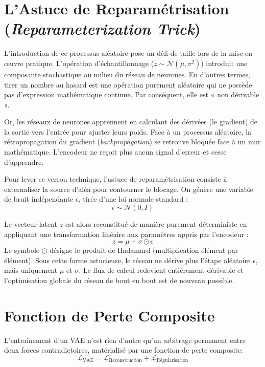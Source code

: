 \documentclass[11pt,a4paper]{report}
\begin{document}
\section{L'Astuce de Reparamétrisation (\textit{Reparameterization Trick})}

L'introduction de ce processus aléatoire pose un défi de taille lors de la mise en œuvre pratique. L'opération d'échantillonnage ($z \sim \mathcal{N}(\mu, \sigma^2)$) introduit une composante stochastique au milieu du réseau de neurones. En d'autres termes, tirer un nombre au hasard est une opération purement aléatoire qui ne possède pas d'expression mathématique continue. Par conséquent, elle est « non dérivable ». 

Or, les réseaux de neurones apprennent en calculant des dérivées (le gradient) de la sortie vers l'entrée pour ajuster leurs poids. Face à un processus aléatoire, la rétropropagation du gradient (\textit{backpropagation}) se retrouve bloquée face à un mur mathématique. L'encodeur ne reçoit plus aucun signal d'erreur et cesse d'apprendre.

Pour lever ce verrou technique, l'astuce de reparamétrisation consiste à externaliser la source d'aléa pour contourner le blocage. On génère une variable de bruit indépendante $\epsilon$, tirée d'une loi normale standard :
\begin{equation}
    \epsilon \sim \mathcal{N}(0, I)
\end{equation}

Le vecteur latent $z$ est alors reconstitué de manière purement déterministe en appliquant une transformation linéaire aux paramètres appris par l'encodeur :
\begin{equation}
    z = \mu + \sigma \odot \epsilon
\end{equation}
Le symbole $\odot$ désigne le produit de Hadamard (multiplication élément par élément). Sous cette forme astucieuse, le réseau ne dérive plus l'étape aléatoire $\epsilon$, mais uniquement $\mu$ et $\sigma$. Le flux de calcul redevient entièrement dérivable et l'optimisation globale du réseau de bout en bout est de nouveau possible.

\section{Fonction de Perte Composite}

L'entraînement d'un VAE n'est rien d'autre qu'un arbitrage permanent entre deux forces contradictoires, matérialisé par une fonction de perte composite:
\begin{equation}
    \mathcal{L}_{\text{VAE}} = \mathcal{L}_{\text{Reconstruction}} + \mathcal{L}_{\text{Régularisation}}
\end{equation}
\end{document}
